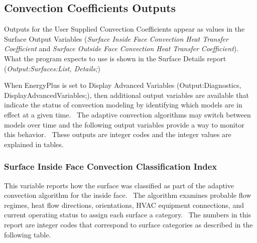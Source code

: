 \subsection{Convection Coefficients Outputs}\label{convection-coefficients-outputs}

Outputs for the User Supplied Convection Coefficients appear as values in the Surface Output Variables (\emph{Surface Inside Face Convection Heat Transfer Coefficient} and \emph{Surface Outside Face Convection Heat Transfer Coefficient}). What the program expects to use is shown in the Surface Details report (\emph{Output:Surfaces:List, Details;})

When EnergyPlus is set to Display Advanced Variables (Output:Diagnostics, DisplayAdvancedVariables;), then additional output variables are available that indicate the status of convection modeling by identifying which models are in effect at a given time.~ The adaptive convection algorithms may switch between models over time and the following output variables provide a way to monitor this behavior.~ These outputs are integer codes and the integer values are explained in tables.

\subsubsection{Surface Inside Face Convection Classification Index}\label{surface-inside-face-convection-classification-index}

This variable reports how the surface was classified as part of the adaptive convection algorithm for the inside face.~ The algorithm examines probable flow regimes, heat flow directions, orientations, HVAC equipment connections, and current operating status to assign each surface a category.~ The numbers in this report are integer codes that correspond to surface categories as described in the following table.

